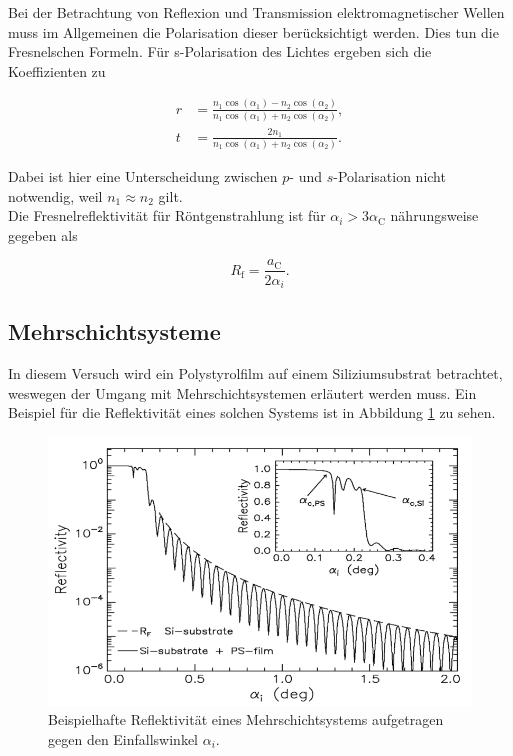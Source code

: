 Bei der Betrachtung von Reflexion und Transmission elektromagnetischer Wellen muss im Allgemeinen die Polarisation dieser 
berücksichtigt werden. Dies tun die Fresnelschen Formeln. Für s-Polarisation des Lichtes ergeben sich die Koeffizienten zu 

\begin{align*}
    r &= \frac{n_1 \cos{\left(\alpha_1\right)}-n_2 \cos{\left(\alpha_2\right)}}{n_1 \cos{\left(\alpha_1\right)}+n_2 \cos{\left(\alpha_2\right)}},\\
    t &= \frac{2n_1}{n_1 \cos{\left(\alpha_1\right)}+n_2 \cos{\left(\alpha_2\right)}}.
\end{align*}

Dabei ist hier eine Unterscheidung zwischen $p$- und $s$-Polarisation nicht notwendig, weil $n_1 \approx n_2$ gilt.\\
Die Fresnelreflektivität für Röntgenstrahlung ist für $\alpha_i > 3\alpha_\text{C}$ nährungsweise gegeben als

\begin{equation*}
    R_\text{f} = \frac{a_\text{C}}{2\alpha_i}.
\end{equation*}

\subsection{Mehrschichtsysteme}

In diesem Versuch wird ein Polystyrolfilm auf einem Siliziumsubstrat betrachtet, weswegen der Umgang mit Mehrschichtsystemen 
erläutert werden muss. Ein Beispiel für die Reflektivität eines solchen Systems ist in Abbildung \ref{fig:mss} zu sehen. 

\begin{figure}
  \centering
  \includegraphics[scale=0.4]{content/mehrschichtsys.png}
  \caption{Beispielhafte Reflektivität eines Mehrschichtsystems aufgetragen gegen den Einfallswinkel $\alpha_i$.\cite{Anleitungalt}}
  \label{fig:mss}
\end{figure}

